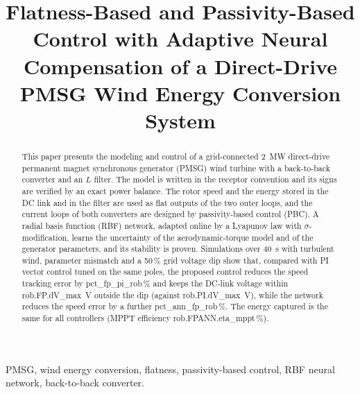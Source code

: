 \documentclass[conference]{IEEEtran}
\begin{document}
\title{Flatness-Based and Passivity-Based Control with Adaptive Neural Compensation of a Direct-Drive PMSG Wind Energy Conversion System}

\author{
\and
{}
\and
{}
}

\maketitle

\begin{abstract}
This paper presents the modeling and control of a grid-connected 2~MW direct-drive permanent magnet
synchronous generator (PMSG) wind turbine with a back-to-back converter and an $L$ filter. The model is
written in the receptor convention and its signs are verified by an exact power balance. The rotor
speed and the energy stored in the DC link and in the filter are used as flat outputs of the two outer
loops, and the current loops of both converters are designed by passivity-based control (PBC). A radial
basis function (RBF) network, adapted online by a Lyapunov law with $\sigma$-modification, learns the
uncertainty of the aerodynamic-torque model and of the generator parameters, and its stability is
proven. Simulations over 40~s with turbulent wind, parameter mismatch and a 50\,\% grid voltage dip
show that, compared with PI vector control tuned on the same poles, the proposed control reduces the
speed tracking error by {{pct_fp_pi_rob}}\,\% and keeps the DC-link voltage within
{{rob.FP.dV_max}}~V outside the dip (against {{rob.PI.dV_max}}~V), while the network reduces the speed
error by a further {{pct_ann_fp_rob}}\,\%. The energy captured is the same for all controllers
(MPPT efficiency {{rob.FPANN.eta_mppt}}\,\%).
\end{abstract}

\begin{IEEEkeywords}
PMSG, wind energy conversion, flatness, passivity-based control, RBF neural network, back-to-back converter.
\end{IEEEkeywords}
\end{document}
